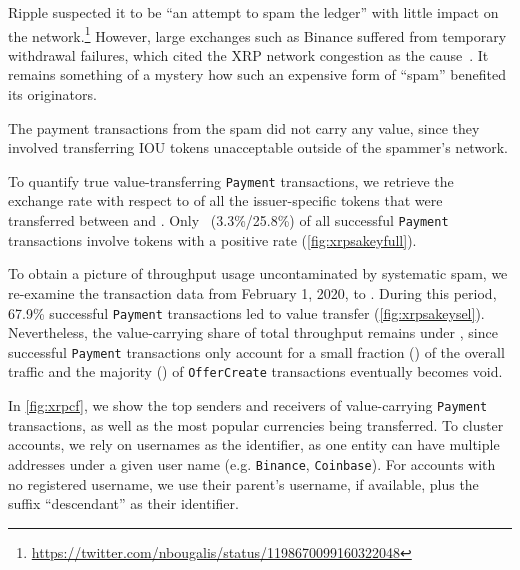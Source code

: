 Ripple suspected it to be ``an attempt to spam the ledger'' with little impact on the network.\footnote{\url{https://twitter.com/nbougalis/status/1198670099160322048}} 
However, large exchanges such as Binance suffered from temporary  withdrawal failures, which cited the XRP network congestion as the cause~\cite{AtoZMarkets2019}. 
It remains something of a mystery how such an expensive form of ``spam'' benefited its originators.

The payment transactions from the spam did not carry any value, since they involved transferring  IOU tokens unacceptable outside of the spammer's network. 

To quantify true value-transferring \texttt{Payment} transactions, we retrieve the exchange rate with respect to  of all the issuer-specific tokens that were transferred between \startdate and \finishdate. 
Only~ (3.3\%/25.8\%) of all successful \texttt{Payment} transactions involve tokens with a positive  rate (\autoref{fig:xrpsakeyfull}). 

To obtain a picture of throughput usage uncontaminated by systematic spam, we re-examine the transaction data from February 1, 2020, to \finishdate. During this period, 67.9\% successful \texttt{Payment} transactions led to value transfer (\autoref{fig:xrpsakeysel}). Nevertheless, the value-carrying share of total throughput remains under , since successful \texttt{Payment} transactions only account for a small fraction () of the overall traffic and the majority () of \texttt{OfferCreate} transactions eventually becomes void.








In \autoref{fig:xrpcf}, we show the top senders and receivers of value-carrying \texttt{Payment} transactions, as well as the most popular currencies being transferred. 
To cluster accounts, we rely on usernames as the identifier, as one entity can have multiple addresses under a given user name (e.g. \texttt{Binance}, \texttt{Coinbase}). 
For accounts with no registered username, we use their parent's username, if available, plus the suffix ``descendant'' as their identifier.

